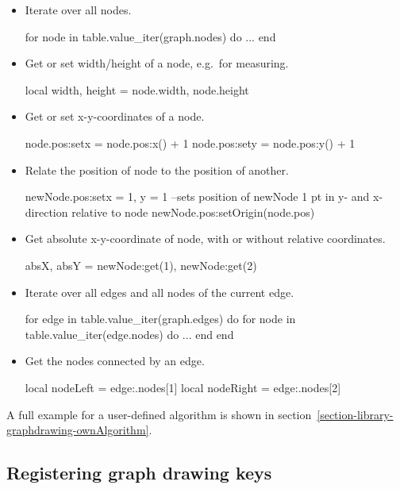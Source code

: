 \begin{itemize}
\item Iterate over all nodes.
\begin{codeexample}
for node in table.value_iter(graph.nodes) do
   ...
end
\end{codeexample}
\item Get or set width/height of a node, e.g.\ for measuring.
\begin{codeexample}
local width, height = node.width, node.height
\end{codeexample}
\item Get or set x-y-coordinates of a node.
\begin{codeexample}
node.pos:set{x = node.pos:x() + 1}
node.pos:set{y = node.pos:y() + 1}
\end{codeexample}
\item Relate the position of node to the position of another.
\begin{codeexample}
newNode.pos:set{x = 1, y = 1}
--sets position of newNode 1 pt in y- and x-direction relative to node
newNode.pos:setOrigin(node.pos)
\end{codeexample}
\item Get absolute x-y-coordinate of node, with or without relative coordinates.
\begin{codeexample}
absX, absY = newNode:get(1), newNode:get(2)
\end{codeexample}
\item Iterate over all edges and all nodes of the current edge.
\begin{codeexample}
for edge in table.value_iter(graph.edges) do
   for node in table.value_iter(edge.nodes) do
      ...
   end
end
\end{codeexample}
\item Get the nodes connected by an edge.
\begin{codeexample}
local nodeLeft = edge:.nodes[1]
local nodeRight = edge:.nodes[2]
\end{codeexample}
\end{itemize}

A full example for a user-defined algorithm is shown in
section~\ref{section-library-graphdrawing-ownAlgorithm}.

\subsection{Registering graph drawing keys}
\label{section-base-graphdrawing-registerKeys}

